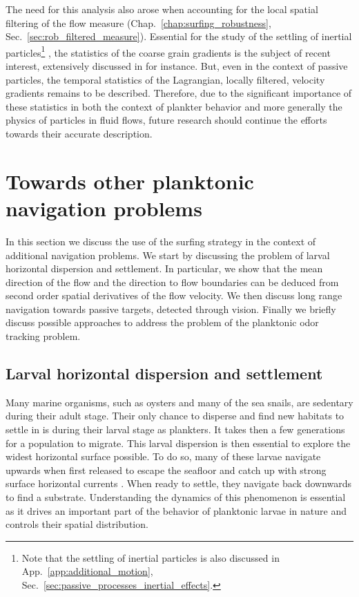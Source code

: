 The need for this analysis also arose when accounting for the local spatial filtering of the flow measure (Chap.~\ref{chap:surfing_robustness}, Sec.~\ref{sec:rob_filtered_measure}).
Essential for the study of the settling of inertial particles\footnote{Note that the settling of inertial particles is also discussed in App.~\ref{app:additional_motion}, Sec.~\ref{sec:passive_processes_inertial_effects}.} \citep{maxey1986gravitational, tom2019multiscale}, the statistics of the coarse grain gradients is the subject of recent interest, extensively discussed in \citet{tom2022investigation} for instance.
But, even in the context of passive particles, the temporal statistics of the Lagrangian, locally filtered, velocity gradients remains to be described.
Therefore, due to the significant importance of these statistics in both the context of plankter behavior and more generally the physics of particles in fluid flows, future research should continue the efforts towards their accurate description.

\section{Towards other planktonic navigation problems}\label{sec:additional_navigation}

In this section we discuss the use of the surfing strategy in the context of additional navigation problems. 
We start by discussing the problem of larval horizontal dispersion and settlement.
In particular, we show that the mean direction of the flow and the direction to flow boundaries can be deduced from second order spatial derivatives of the flow velocity.
We then discuss long range navigation towards passive targets, detected through vision.
Finally we briefly discuss possible approaches to address the problem of the planktonic odor tracking problem.

\subsection{Larval horizontal dispersion and settlement}\label{sec:horizontal_dispersion}

Many marine organisms, such as oysters and many of the sea snails, are sedentary during their adult stage.
Their only chance to disperse and find new habitats to settle in is during their larval stage as plankters.
It takes then a few generations for a population to migrate.
This larval dispersion is then essential to explore the widest horizontal surface possible.
To do so, many of these larvae navigate upwards when first released to escape the seafloor and catch up with strong surface horizontal currents \citep{mcedward2020ecology, welch2001flood, kingsford2002sensory}.
When ready to settle, they navigate back downwards to find a substrate.
Understanding the dynamics of this phenomenon is essential as it drives an important part of the behavior of planktonic larvae in nature and controls their spatial distribution.

